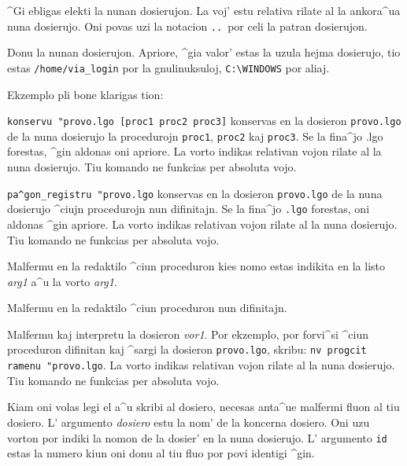 
^Gi ebligas elekti la nunan dosierujon.  La voj' estu relativa rilate
al la ankora^ua nuna dosierujo.  Oni povas uzi la notacion
\og\texttt{..}\fg\ por celi la patran dosierujon.


Donu la nunan dosierujon.  Apriore, ^gia valor' estas la uzula hejma
dosierujo, tio estas \texttt{/home/via\_login} por la gnulinuksuloj,
\texttt{C:\textbackslash WINDOWS} por aliaj.


Ekzemplo pli bone klarigas tion:

\texttt{konservu "provo.lgo [proc1 proc2 proc3]} konservas en la
dosieron \texttt{provo.lgo} de la nuna dosierujo la procedurojn
\texttt{proc1}, \texttt{proc2} kaj \texttt{proc3}.  Se la fina^jo .lgo
forestas, ^gin aldonas oni apriore.  La vorto indikas relativan vojon
rilate al la nuna dosierujo.  Tiu komando ne funkcias per absoluta
vojo.


\texttt{pa^gon\_registru "provo.lgo} konservas en la dosieron
\texttt{provo.lgo} de la nuna dosierujo ^ciujn procedurojn nun
difinitajn.  Se la fina^jo \texttt{.lgo} forestas, oni aldonas ^gin
apriore.  La vorto indikas relativan vojon rilate al la nuna
dosierujo.  Tiu komando ne funkcias per absoluta vojo.


Malfermu en la redaktilo ^ciun proceduron kies nomo estas indikita en
la listo \textit{arg1} a^u la vorto \textit{arg1}.


Malfermu en la redaktilo ^ciun proceduron nun difinitajn.


Malfermu kaj interpretu la dosieron \textit{vor1}.  Por ekzemplo, por
forvi^si ^ciun proceduron difinitan kaj ^sargi la dosieron
\texttt{provo.lgo}, skribu: \texttt{nv progcit ramenu "provo.lgo}.  La
vorto indikas relativan vojon rilate al la nuna dosierujo.  Tiu
komando ne funkcias per absoluta vojo.


Kiam oni volas legi el a^u skribi al dosiero, necesas anta^ue malfermi
fluon al tiu dosiero.  L' argumento \textit{dosiero} estu la nom' de
la koncerna dosiero.  Oni uzu vorton por indiki la nomon de la dosier'
en la nuna dosierujo.  L' argumento \texttt{id} estas la numero kiun
oni donu al tiu fluo por povi identigi ^gin.


